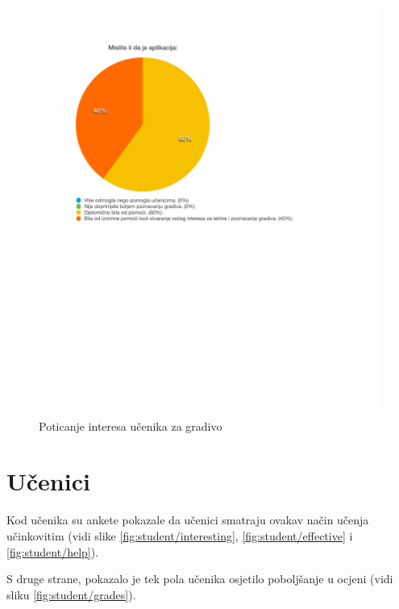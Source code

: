 \documentclass{scrreprt}
\begin{document}
\begin{figure}[H]
  \includegraphics[width=\textwidth, clip=true, trim=0 2.5cm 0 0]{school/help}
  \caption{Poticanje interesa učenika za gradivo}
  \label{fig:school/help}
\end{figure}

\section{Učenici}

Kod učenika su ankete pokazale da učenici smatraju ovakav način učenja
učinkovitim (vidi slike \ref{fig:student/interesting},
\ref{fig:student/effective} i \ref{fig:student/help}).

S druge strane, pokazalo je tek pola učenika osjetilo poboljšanje u ocjeni
(vidi sliku \ref{fig:student/grades}).
\end{document}
